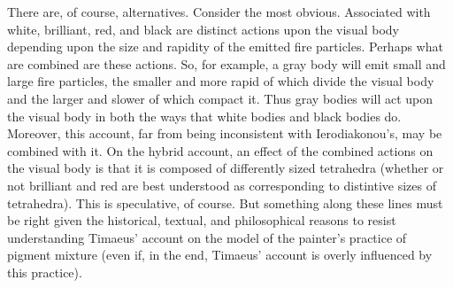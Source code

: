 There are, of course, alternatives. Consider the most obvious. Associated with white, brilliant, red, and black are distinct actions upon the visual body depending upon the size and rapidity of the emitted fire particles. Perhaps what are combined are these actions. So, for example, a gray body will emit small and large fire particles, the smaller and more rapid of which divide the visual body and the larger and slower of which compact it. Thus gray bodies will act upon the visual body in both the ways that white bodies and black bodies do. Moreover, this account, far from being inconsistent with Ierodiakonou's, may be combined with it. On the hybrid account, an effect of the combined actions on the visual body is that it is composed of differently sized tetrahedra (whether or not brilliant and red are best understood as corresponding to distintive sizes of tetrahedra). This is speculative, of course. But something along these lines must be right given the historical, textual, and philosophical reasons to resist understanding Timaeus' account on the model of the painter's practice of pigment mixture (even if, in the end, Timaeus' account is overly influenced by this practice).


